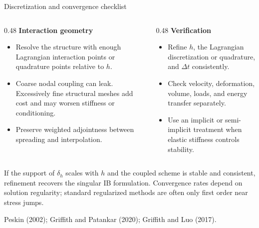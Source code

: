 \documentclass[aspectratio=169,11pt]{beamer}
\begin{document}
\begin{frame}{Discretization and convergence checklist}
\begin{columns}[T,onlytextwidth]
\begin{column}{0.48\textwidth}
\textbf{Interaction geometry}
\begin{itemize}\itemsep3pt
  \item Resolve the structure with enough Lagrangian interaction points or quadrature points relative to $h$.
  \item Coarse nodal coupling can leak. Excessively fine structural meshes add cost and may worsen stiffness or conditioning.
  \item Preserve weighted adjointness between spreading and interpolation.
\end{itemize}
\end{column}
\begin{column}{0.48\textwidth}
\textbf{Verification}
\begin{itemize}\itemsep3pt
  \item Refine $h$, the Lagrangian discretization or quadrature, and $\Delta t$ consistently.
  \item Check velocity, deformation, volume, loads, and energy transfer separately.
  \item Use an implicit or semi-implicit treatment when elastic stiffness controls stability.
\end{itemize}
\end{column}
\end{columns}
\begin{punchbox}
\small If the support of $\delta_h$ scales with $h$ and the coupled scheme is stable and consistent, refinement recovers the singular IB formulation. Convergence rates depend on solution regularity; standard regularized methods are often only first order near stress jumps.
\end{punchbox}
{\scriptsize Peskin (2002); Griffith and Patankar (2020); Griffith and Luo (2017).}
\end{frame}
\end{document}
